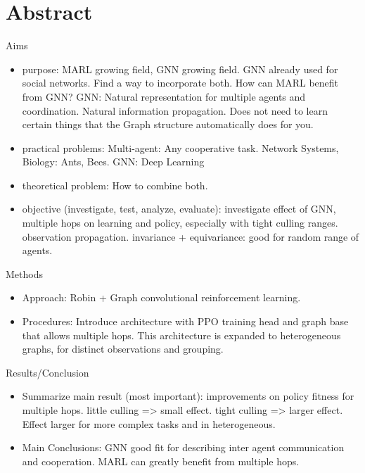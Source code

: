 
\chapter*{Abstract}

Aims
\begin{itemize}[noitemsep,nolistsep]
    \item purpose: MARL growing field, GNN growing field. GNN already used for social networks. Find a way to incorporate both. How can MARL benefit from GNN? GNN: Natural representation for multiple agents and coordination. Natural information propagation. Does not need to learn certain things that the Graph structure automatically does for you.
    \item practical problems: Multi-agent: Any cooperative task. Network Systems, Biology: Ants, Bees. GNN: Deep Learning
    \item theoretical problem: How to combine both.
    \item objective (investigate, test, analyze, evaluate): investigate effect of GNN, multiple hops on learning and policy, especially with tight culling ranges. observation propagation. invariance + equivariance: good for random range of agents.
\end{itemize} \par


Methods
\begin{itemize}[noitemsep,nolistsep]
    \item Approach: Robin + Graph convolutional reinforcement learning.
    \item Procedures: Introduce architecture with PPO training head and graph base that allows multiple hops. This architecture is expanded to heterogeneous graphs, for distinct observations and grouping.
\end{itemize} \par


Results/Conclusion
\begin{itemize}[noitemsep,nolistsep]
    \item Summarize main result (most important): improvements on policy fitness for multiple hops. little culling => small effect. tight culling => larger effect. Effect larger for more complex tasks and in heterogeneous.
    \item Main Conclusions: GNN good fit for describing inter agent communication and cooperation. MARL can greatly benefit from multiple hops.
\end{itemize}

